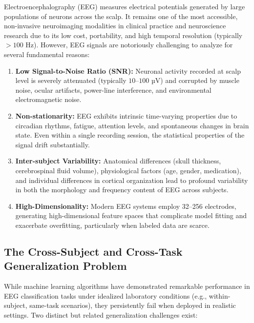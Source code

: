 \documentclass[11pt]{article}
\begin{document}
Electroencephalography (EEG) measures electrical potentials generated by large populations of neurons across the scalp. It remains one of the most accessible, non-invasive neuroimaging modalities in clinical practice and neuroscience research due to its low cost, portability, and high temporal resolution (typically $>100$ Hz). However, EEG signals are notoriously challenging to analyze for several fundamental reasons:

\begin{enumerate}
    \item \textbf{Low Signal-to-Noise Ratio (SNR):} Neuronal activity recorded at scalp level is severely attenuated (typically $10$--$100$ µV) and corrupted by muscle noise, ocular artifacts, power-line interference, and environmental electromagnetic noise.
    
    \item \textbf{Non-stationarity:} EEG exhibits intrinsic time-varying properties due to circadian rhythms, fatigue, attention levels, and spontaneous changes in brain state. Even within a single recording session, the statistical properties of the signal drift substantially.
    
    \item \textbf{Inter-subject Variability:} Anatomical differences (skull thickness, cerebrospinal fluid volume), physiological factors (age, gender, medication), and individual differences in cortical organization lead to profound variability in both the morphology and frequency content of EEG across subjects.
    
    \item \textbf{High-Dimensionality:} Modern EEG systems employ 32--256 electrodes, generating high-dimensional feature spaces that complicate model fitting and exacerbate overfitting, particularly when labeled data are scarce.
\end{enumerate}

\subsection{The Cross-Subject and Cross-Task Generalization Problem}

While machine learning algorithms have demonstrated remarkable performance in EEG classification tasks under idealized laboratory conditions (e.g., within-subject, same-task scenarios), they persistently fail when deployed in realistic settings. Two distinct but related generalization challenges exist:
\end{document}
